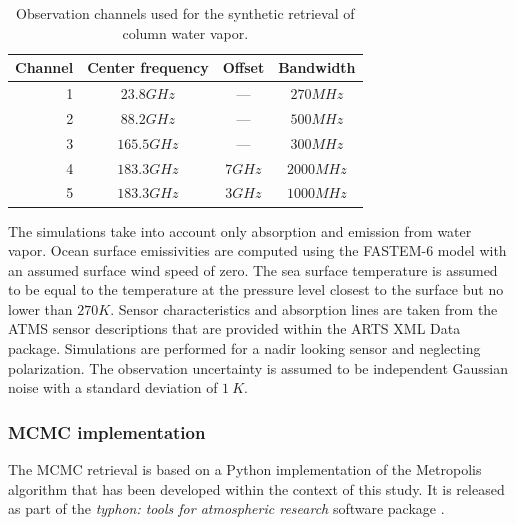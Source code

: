 \documentclass[journal abbreviation, manuscript]{copernicus}
\begin{document}
\begin{table}[hbpt]
\centering
\begin{tabular}{|r|c|c|c|}
    \hline
    Channel & Center frequency & Offset           & Bandwidth                \\ 
    \hline
                  1 & $23.8 \unit{GHz}$ &        ---       & $270 \unit{MHz}$ \\
                  2 & $88.2 \unit{GHz}$ &        ---       & $500 \unit{MHz}$ \\
                  3 & $165.5\unit{GHz}$ &        ---       & $300 \unit{MHz}$ \\
                  4 & $183.3\unit{GHz}$ & $7   \unit{GHz}$ & $2000\unit{MHz}$ \\
                  5 & $183.3\unit{GHz}$ & $3   \unit{GHz}$ & $1000\unit{MHz}$ \\
    \hline
\end{tabular}
\caption{Observation channels used for the synthetic retrieval of column water vapor.}
\label{tab:channels}
\end{table}

The simulations take into account only absorption and emission from water vapor.
Ocean surface emissivities are computed using the FASTEM-6 model \citep{fastem6}
with an assumed surface wind speed of zero. The sea surface temperature is
assumed to be equal to the temperature at the pressure level closest to the
surface but no lower than $270\unit{K}$. Sensor characteristics and absorption
lines are taken from the ATMS sensor descriptions that are provided within the
ARTS XML Data package. Simulations are performed for a nadir looking sensor and
neglecting polarization. The observation uncertainty is assumed to be
independent Gaussian noise with a standard deviation of $1\:\unit{K}$.


\subsubsection{MCMC implementation}

  The MCMC retrieval is based on a Python implementation of the Metropolis
  algorithm \citep[Ch. 12]{bda} that has been developed within the context of
  this study. It is released as part of the \textit{typhon: tools for atmospheric
  research} software package \citep{typhon}.
\end{document}
